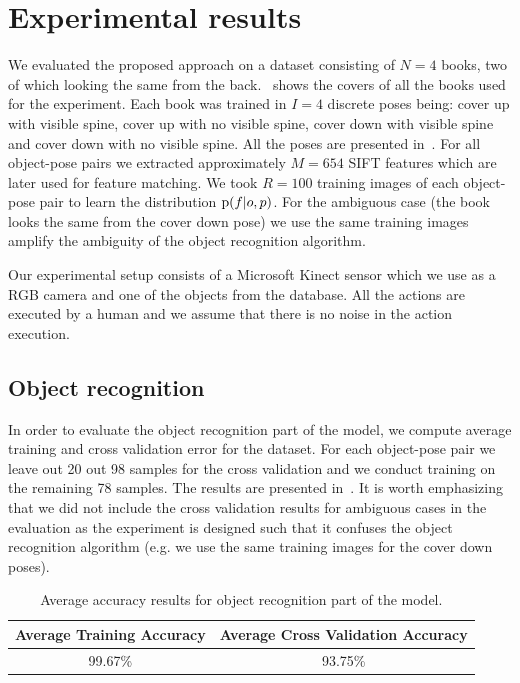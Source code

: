 \section{Experimental results}

    We evaluated the proposed approach on a dataset consisting of $N = 4$ books, two of which looking the same from the back.~ shows the covers of all the books used for the experiment. Each book was trained in $I = 4$ discrete poses being: cover up with visible spine, cover up with no visible spine, cover down with visible spine and cover down with no visible spine. All the poses are presented in~. For all object-pose pairs we extracted approximately $M = 654$ SIFT features which are later used for feature matching. We took $R = 100$ training images of each object-pose pair to learn the distribution $\text{p}(f|o,p)$. For the ambiguous case (the book looks the same from the cover down pose) we use the same training images amplify the ambiguity of the object recognition algorithm.

    Our experimental setup consists of a Microsoft Kinect sensor which we use as a RGB camera and one of the objects from the database. All the actions are executed by a human and we assume that there is no noise in the action execution. 

    \subsection{Object recognition}
        In order to evaluate the object recognition part of the model, we compute average training and cross validation error for the dataset. For each object-pose pair we leave out 20 out 98 samples for the cross validation and we conduct training on the remaining 78 samples. The results are presented in~. It is worth emphasizing that we did not include the cross validation results for ambiguous cases in the evaluation as the experiment is designed such that it confuses the object recognition algorithm (e.g. we use the same training images for the cover down poses).  
        
        \begin{table}[h]
                \centering
                \begin{tabular}{|c|c|}
                \hline
                Average Training Accuracy & Average Cross Validation Accuracy \\
                \hline
                99.67\% & 93.75\% \\
                \hline
                \end{tabular}
                \caption{Average accuracy results for object recognition part of the model.}
                \label{tab:accuracy}
        \end{table}

